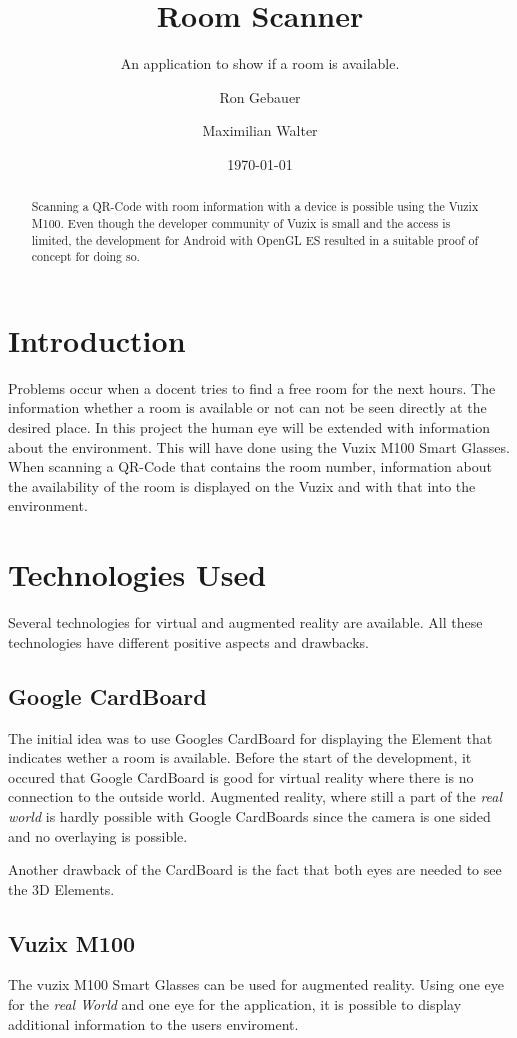 \documentclass[11pt]{scrartcl}
\title{Room Scanner}
\subtitle{An application to show if a room is available.}
\author{Ron Gebauer \and Maximilian Walter}
\date{\today}
\begin{document}
\maketitle

\begin{abstract}
	Scanning a QR-Code with room information with a device is possible using the Vuzix M100. Even though the developer community of Vuzix is small and the access is limited, the development for Android with OpenGL ES resulted in a suitable proof of concept for doing so. 
\end{abstract}

\begin{multicols}{2}
	\section{Introduction}
	Problems occur when a docent tries to find a free room for the next hours. The information whether a room is available or not can not be seen directly at the desired place. In this project the human eye will be extended with information about the environment. This will have done using the Vuzix M100 Smart Glasses. When scanning a QR-Code that contains the room number, information about the availability of the room is displayed on the Vuzix and with that into the environment.
	
	\section{Technologies Used}
	Several technologies for virtual and augmented reality are available. All these technologies have different positive aspects and drawbacks.
		\subsection{Google CardBoard}
			The initial idea was to use Googles CardBoard for displaying the Element that indicates wether a room is available. Before the start of the development, it occured that Google CardBoard is good for virtual reality where there is no connection to the outside world. Augmented reality, where still a part of the \emph{real world} is hardly possible with Google CardBoards since the camera is one sided and no overlaying is possible.
	
			Another drawback of the CardBoard is the fact that both eyes are needed to see the 3D Elements.   
		
		\subsection{Vuzix M100}
			The vuzix M100 Smart Glasses can be used for augmented reality. Using one eye for the \emph{real World} and one eye for the application, it is possible to display additional information to the users enviroment.
		

\end{multicols}
\end{document}
